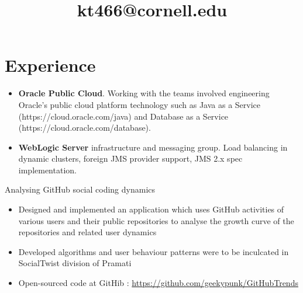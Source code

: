 \documentclass[11pt,a4paper]{moderncv}
\title{kt466@cornell.edu}
\begin{document}
\maketitle\vspace{-10ex}
\section{Experience}

 {
\begin{itemize}%
\item \textbf{Oracle Public Cloud}. Working with the teams involved engineering Oracle's public cloud platform technology such as Java as a Service (https://cloud.oracle.com/java) and Database as a Service (https://cloud.oracle.com/database).
\item \textbf{WebLogic Server} infrastructure and messaging group. Load balancing in dynamic clusters, foreign JMS provider support, JMS 2.x spec implementation.
\end{itemize}
}

 {Analysing GitHub social coding dynamics%
\begin{itemize}%
\item Designed and implemented an application which uses GitHub activities of various users and their public repositories to analyse the growth curve of the repositories and related user dynamics
\item Developed algorithms and user behaviour patterns were to be inculcated in SocialTwist division of Pramati 
\item Open-sourced code at GitHib : \href{https://github.com/geekypunk/GitHubTrends}{https://github.com/geekypunk/GitHubTrends}
\end{itemize}
}

\end{document}
